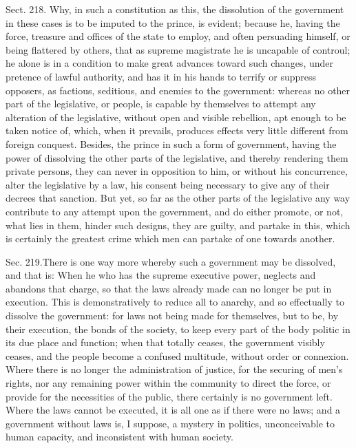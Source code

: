 \documentclass[11pt,openany]{book}
\begin{document}
Sect. 218. Why, in such a constitution as this, the dissolution of the government in these cases is to be imputed to the prince, is evident; because he, having the force, treasure and offices of the state to employ, and often persuading himself, or being flattered by others, that as supreme magistrate he is uncapable of controul; he alone is in a condition to make great advances toward such changes, under pretence of lawful authority, and has it in his hands to terrify or suppress opposers, as factious, seditious, and enemies to the government: whereas no other part of the legislative, or people, is capable by themselves to attempt any alteration of the legislative, without open and visible rebellion, apt enough to be taken notice of, which, when it prevails, produces effects very little different from foreign conquest. Besides, the prince in such a form of government, having the power of dissolving the other parts of the legislative, and thereby rendering them private persons, they can never in opposition to him, or without his concurrence, alter the legislative by a law, his consent being necessary to give any of their decrees that sanction. But yet, so far as the other parts of the legislative any way contribute to any attempt upon the government, and do either promote, or not, what lies in them, hinder such designs, they are guilty, and partake in this, which is certainly the greatest crime which men can partake of one towards another.

Sec. 219.There is one way more whereby such a government may be dissolved, and that is: When he who has the supreme executive power, neglects and abandons that charge, so that the laws already made can no longer be put in execution. This is demonstratively to reduce all to anarchy, and so effectually to dissolve the government: for laws not being made for themselves, but to be, by their execution, the bonds of the society, to keep every part of the body politic in its due place and function; when that totally ceases, the government visibly ceases, and the people become a confused multitude, without order or connexion. Where there is no longer the administration of justice, for the securing of men's rights, nor any remaining power within the community to direct the force, or provide for the necessities of the public, there certainly is no government left. Where the laws cannot be executed, it is all one as if there were no laws; and a government without laws is, I suppose, a mystery in politics, unconceivable to human capacity, and inconsistent with human society.
\end{document}
